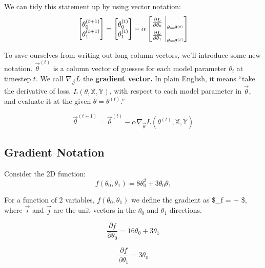 \documentclass[
  letterpaper,
  DIV=11,
  numbers=noendperiod]{scrreprt}
\begin{document}
We can tidy this statement up by using vector notation:
\[\begin{bmatrix}
           \theta_{0}^{(t+1)} \\
           \theta_{1}^{(t+1)} \\
         \end{bmatrix}
=
\begin{bmatrix}
           \theta_{0}^{(t)} \\
           \theta_{1}^{(t)} \\
         \end{bmatrix}
- \alpha
\begin{bmatrix}
           \frac{\partial L}{\partial \theta_{0}}\Bigm\vert_{\theta=\theta^{(t)}} \\
           \frac{\partial L}{\partial \theta_{1}}\Bigm\vert_{\theta=\theta^{(t)}} \\
         \end{bmatrix}
\]

To save ourselves from writing out long column vectors, we'll introduce
some new notation. \(\vec{\theta}^{(t)}\) is a column vector of guesses
for each model parameter \(\theta_i\) at timestep \(t\). We call
\(\nabla_{\vec{\theta}} L\) the \textbf{gradient vector.} In plain
English, it means ``take the derivative of loss,
\(L(\theta, \mathbb{X}, \mathbb{Y})\), with respect to each model
parameter in \(\vec{\theta}\), and evaluate it at the given
\(\theta = \theta^{(t)}\).''

\[\vec{\theta}^{(t+1)}
= \vec{\theta}^{(t)} - \alpha \nabla_{\vec{\theta}} L(\theta^{(t)}, \mathbb{X}, \mathbb{Y})
\]

\hypertarget{gradient-notation}{%
\subsection{Gradient Notation}\label{gradient-notation}}

Consider the 2D function:
\[f(\theta_0, \theta_1) = 8\theta_0^2 + 3\theta_0\theta_1\]

For a function of 2 variables, \(f(\theta_0, \theta_1)\) we define the
gradient as \$\nabla\_\theta f = 
 +   \$, where
\(\vec{i}\) and \(\vec{j}\) are the unit vectors in the \(\theta_0\) and
\(\theta_1\) directions.

\[\frac{\partial f}{\partial \theta_0} = 16\theta_0 + 3\theta_1\]

\[\frac{\partial f}{\partial \theta_1} = 3\theta_0\]
\end{document}
